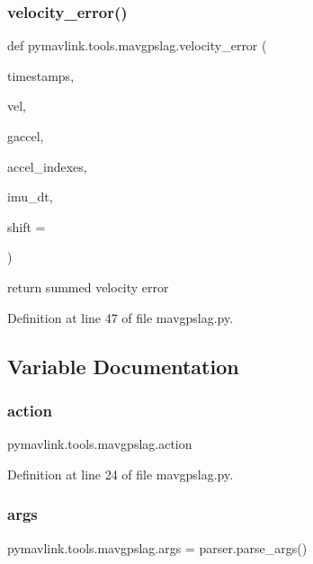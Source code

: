 \subsubsection{\texorpdfstring{velocity\_error()}{velocity\_error()}}
{\footnotesize\ttfamily def pymavlink.\+tools.\+mavgpslag.\+velocity\+\_\+error (\begin{DoxyParamCaption}\item[{}]{timestamps,  }\item[{}]{vel,  }\item[{}]{gaccel,  }\item[{}]{accel\+\_\+indexes,  }\item[{}]{imu\+\_\+dt,  }\item[{}]{shift = {} }\end{DoxyParamCaption})}

\begin{DoxyVerb}return summed velocity error\end{DoxyVerb}
 

Definition at line 47 of file mavgpslag.\+py.



\subsection{Variable Documentation}
\mbox{\label{namespacepymavlink_1_1tools_1_1mavgpslag_a781ed3df690ef65f259d5a228f8c0e8c}} 
\subsubsection{\texorpdfstring{action}{action}}
{\footnotesize\ttfamily pymavlink.\+tools.\+mavgpslag.\+action}



Definition at line 24 of file mavgpslag.\+py.

\mbox{\label{namespacepymavlink_1_1tools_1_1mavgpslag_a211b75a871dce5e90cf7b21c93ce4478}} 
\subsubsection{\texorpdfstring{args}{args}}
{\footnotesize\ttfamily pymavlink.\+tools.\+mavgpslag.\+args = parser.\+parse\+\_\+args()}



